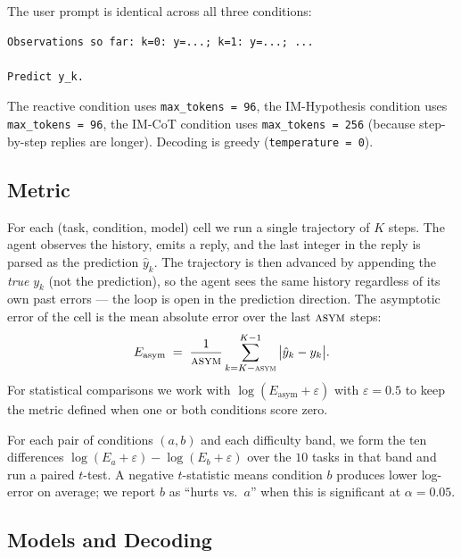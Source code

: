 \documentclass[11pt]{article}
\begin{document}
The user prompt is identical across all three conditions:
\begin{Verbatim}[fontsize=\small,frame=single]
Observations so far: k=0: y=...; k=1: y=...; ...

Predict y_k.
\end{Verbatim}

The reactive condition uses \verb|max_tokens = 96|, the IM-Hypothesis
condition uses \verb|max_tokens = 96|, the IM-CoT condition uses
\verb|max_tokens = 256| (because step-by-step replies are longer).
Decoding is greedy (\verb|temperature = 0|).

\subsection{Metric}
\label{sec:metric}

For each (task, condition, model) cell we run a single trajectory of
$K$ steps.  The agent observes the history, emits a reply, and the
last integer in the reply is parsed as the prediction $\hat y_k$.
The trajectory is then advanced by appending the \emph{true} $y_k$
(not the prediction), so the agent sees the same history regardless
of its own past errors --- the loop is open in the prediction
direction.  The asymptotic error of the cell is the mean absolute
error over the last $\textsc{asym}$ steps:
\[
  E_{\text{asym}} \;=\; \frac{1}{\textsc{asym}}
  \sum_{k = K - \textsc{asym}}^{K - 1}
  \big| \hat y_k - y_k \big|.
\]
For statistical comparisons we work with $\log(E_{\text{asym}} +
\varepsilon)$ with $\varepsilon = 0.5$ to keep the metric defined
when one or both conditions score zero.

For each pair of conditions $(a, b)$ and each difficulty band, we
form the ten differences
$\log(E_a + \varepsilon) - \log(E_b + \varepsilon)$ over the
$10$ tasks in that band and run a paired $t$-test.  A negative
$t$-statistic means condition $b$ produces lower log-error on
average; we report $b$ as ``hurts vs.\ $a$'' when this is
significant at $\alpha = 0.05$.

\subsection{Models and Decoding}
\label{sec:models}
\end{document}
